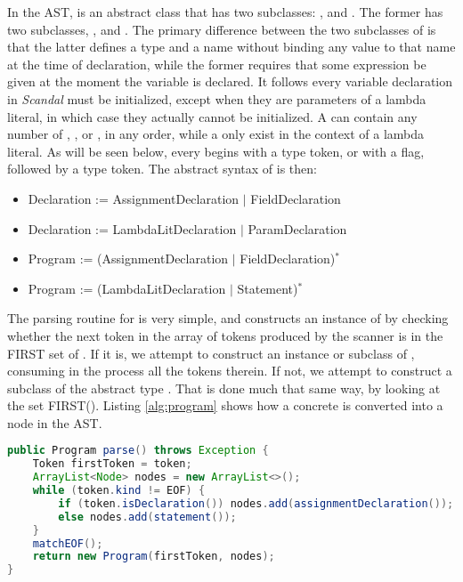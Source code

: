 In the AST,  is an abstract class that has two subclasses: , and . The former has two subclasses, , and . The primary difference between the two subclasses of  is that the latter defines a type and a name without binding any value to that name at the time of declaration, while the former requires that some expression be given at the moment the variable is declared. It follows every variable declaration in \emph{Scandal} must be initialized, except when they are parameters of a lambda literal, in which case they actually cannot be initialized. A  can contain any number of , , or , in any order, while a  only exist in the context of a lambda literal. As will be seen below, every  begins with a type token, or with a  flag, followed by a type token. The abstract syntax of  is then:

\begin{itemize}
	\item Declaration := AssignmentDeclaration $|$ FieldDeclaration
	\item Declaration := LambdaLitDeclaration $|$ ParamDeclaration
	\item Program := (AssignmentDeclaration $|$ FieldDeclaration)$^*$
	\item Program := (LambdaLitDeclaration $|$ Statement)$^*$
\end{itemize}

The parsing routine for  is very simple, and constructs an instance of  by checking whether the next token in the array of tokens produced by the scanner is in the FIRST set of . If it is, we attempt to construct an instance or subclass of , consuming in the process all the tokens therein. If not, we attempt to construct a subclass of the abstract type . That is done much that same way, by looking at the set FIRST(). Listing \ref{alg:program} shows how a concrete  is converted into a  node in the AST.

\begin{lstlisting}[language=Java,caption={Parsing topmost-level constructs in \emph{Scandal}.},label={alg:program}]
public Program parse() throws Exception {
	Token firstToken = token;
	ArrayList<Node> nodes = new ArrayList<>();
	while (token.kind != EOF) {
		if (token.isDeclaration()) nodes.add(assignmentDeclaration());
		else nodes.add(statement());
	}
	matchEOF();
	return new Program(firstToken, nodes);
}
\end{lstlisting}


